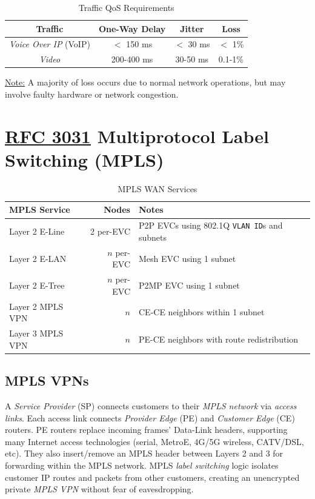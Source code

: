 \documentclass[12pt]{article}
\newif\ifcolor											%
\newcommand{\note}[1]{\ifcolor \colorbox{#1}{Note:}\else \underline{Note:}\fi}
\newcommand{\RFC}[1]{\href{https://datatracker.ietf.org/doc/html/rfc#1}{RFC #1}}
\begin{document}
	\begin{table}[H]
	\centering
	\caption{Traffic QoS Requirements \label{tab:QOS TRAFFIC}}
	\begin{tabular}{@{} c | c c c @{}}
	\textbf{Traffic}			&\textbf{One-Way Delay}	& \textbf{Jitter}	&\textbf{Loss}\\\hline
	\textit{Voice Over IP} (VoIP)	& $<$ 150 ms 			& $<$ 30 ms 	& $<$ 1\%\\
	\textit{Video}			& 200-400 ms 			& 30-50 ms 	& 0.1-1\%\\
	\end{tabular}
	\end{table}
	\note{Goldenrod} A majority of loss occurs due to normal network operations, but may involve faulty hardware or network congestion.





\section[RFC 3031 MPLS]{\RFC{3031} Multiprotocol Label Switching (MPLS)\label{sec:MPLS}}
	\begin{table}[H]
	\centering
	\caption{MPLS WAN Services \label{tab:MPLS SERVICES}}
	\begin{tabular}{@{} l r l @{}}\hline
	\textbf{MPLS Service}	& \textbf{Nodes}	& \textbf{Notes}\\\hline
	Layer 2 E-Line		& 2 per-EVC	& P2P EVCs using 802.1Q \texttt{VLAN ID}s and subnets\\
	Layer 2 E-LAN		& $n$ per-EVC	& Mesh EVC using 1 subnet\\
	Layer 2 E-Tree		& $n$ per-EVC	& P2MP EVC using 1 subnet\\
	Layer 2 MPLS VPN	& $n$		& CE-CE neighbors within 1 subnet\\
	Layer 3 MPLS VPN	& $n$		& PE-CE neighbors with route redistribution\\\hline
	\end{tabular}\end{table}%


	\subsection{MPLS VPNs \label{subsec:MPLS VPN}}
	A \textit{Service Provider} (SP) connects customers to their \textit{MPLS network} via \textit{access links}. Each access link connects \textit{Provider Edge} (PE) and \textit{Customer Edge} (CE) routers. PE routers replace incoming frames' Data-Link headers, supporting many Internet access technologies (serial, MetroE, 4G/5G wireless, CATV/DSL, etc). They also insert/remove an MPLS header between Layers 2 and 3 for forwarding within the MPLS network. MPLS \textit{label switching} logic isolates customer IP routes and packets from other customers, creating an unencrypted private \textit{MPLS VPN} without fear of eavesdropping.
\end{document}

